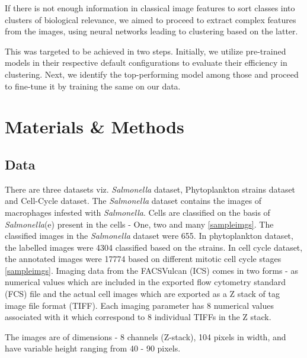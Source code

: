 \documentclass[12pt,a4paper]{article}
\begin{document}
If there is not enough information in classical image features to sort classes into clusters of biological relevance, we aimed to proceed to extract complex features from the images, using neural networks leading to clustering based on the latter.

This was targeted to be achieved in two steps. Initially, we utilize pre-trained models in their respective default configurations to evaluate their efficiency in clustering. Next, we identify the top-performing model among those and proceed to fine-tune it by training the same on our data.



\newpage
\section{Materials \& Methods}
\subsection{Data}
There are three datasets viz. \textit{Salmonella} dataset, Phytoplankton strains dataset and Cell-Cycle dataset. The \textit{Salmonella} dataset contains the images of macrophages infested with \textit{Salmonella}. Cells are classified on the basis of \textit{Salmonella}(e) present in the cells - One, two and many \ref{sampleimgs}. The classified images in the \textit{Salmonella} dataset were 655. %
In phytoplankton dataset, the labelled images were 4304 classified based on the strains. In cell cycle dataset, the annotated images were 17774 based on different mitotic cell cycle stages \ref{sampleimgs}. Imaging data from the FACSVulcan (ICS) comes in two forms - as numerical values which are included in the exported flow cytometry standard (FCS) file and the actual cell images which are exported as a Z stack of tag image file format (TIFF). Each imaging parameter has 8 numerical values associated with it which correspond to 8 individual TIFFs in the Z stack.

The images are of dimensions - 8 channels (Z-stack), 104 pixels in width, and have variable height ranging from 40 - 90 pixels.
\end{document}
